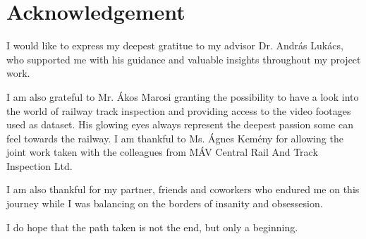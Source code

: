 \section*{Acknowledgement}
I would like to express my deepest gratitue to my advisor Dr. András Lukács,
who supported me with his guidance and valuable insights throughout my project work.

I am also grateful to Mr. Ákos Marosi granting the possibility to have a
look into the world of railway track inspection and providing access to the video
footages used as dataset.
His glowing eyes always represent the deepest passion some can feel towards the railway.
I am thankful to Ms. Ágnes Kemény for allowing the joint work taken with the colleagues
from MÁV Central Rail And Track Inspection Ltd.

I am also thankful for my partner, friends and coworkers who endured me on this journey while
I was balancing on the borders of insanity and obsessesion.

I do hope that the path taken is not the end, but only a beginning.